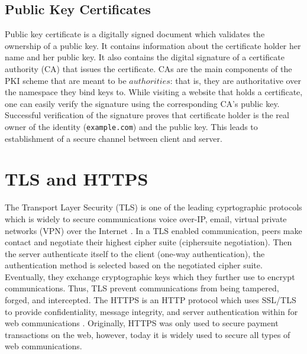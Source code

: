  
\subsection{Public Key Certificates}

Public key certificate is a digitally signed document which validates the ownership of a public key. It contains information about the certificate holder \ie her name and her public key. It also contains the digital signature of a certificate authority (CA) that issues the certificate. CAs are the main components of the PKI scheme that are meant to be $authorities$: that is, they are authoritative over the namespace they bind keys to. While visiting a website that holds a certificate, one can easily verify the signature using the corresponding CA's public key. Successful verification of the signature proves that certificate holder is the real owner of the identity (\ie \texttt{example.com}) and the public key. This leads to establishment of a secure channel between client and server. 



\section{TLS and HTTPS}

The Transport Layer Security (TLS) is one of the leading cyprtographic protocols which is widely to secure communications \ie voice over-IP, email, virtual private networks (VPN) \etc over the Internet \cite{rescorla2001ssl}. In a TLS enabled communication, peers make contact and negotiate their highest cipher suite (ciphersuite negotiation). Then the server authenticate itself to the client (one-way authentication), the authentication method is selected based on the negotiated cipher suite. Eventually, they exchange cryptographic keys which they further use to encrypt communications. Thus, TLS prevent communications from being tampered, forged, and intercepted. The HTTPS is an HTTP protocol which uses SSL/TLS to provide confidentiality, message integrity, and server authentication within for web communications \cite{rescorla2000http}. Originally, HTTPS was only used to secure payment transactions on the web, however, today it is widely used to secure all types of web communications.


